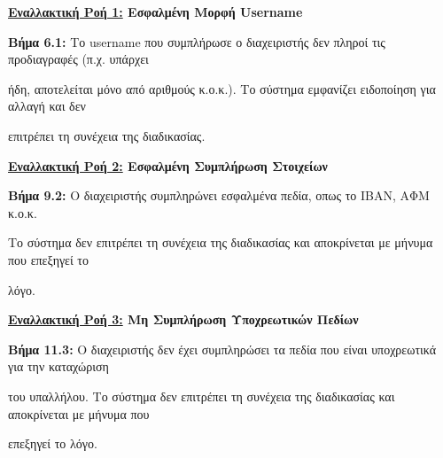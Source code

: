 \documentclass{article}
\begin{document}
  \textbf{\underline{Εναλλακτική Ροή 1:} Εσφαλμένη Μορφή Username} \vspace{0.2cm}
\par \textbf{Βήμα 6.1:} Το username που συμπλήρωσε ο διαχειριστής δεν πληροί τις προδιαγραφές (π.χ. υπάρχει \par ήδη, αποτελείται μόνο από αριθμούς κ.ο.κ.). Tο σύστημα εμφανίζει ειδοποίηση για αλλαγή και δεν \par επιτρέπει τη συνέχεια της διαδικασίας.\vspace{0.1cm}

\newpage

\textbf{\underline{Εναλλακτική Ροή 2:} Εσφαλμένη Συμπλήρωση Στοιχείων} \vspace{0.2cm}
\par \textbf{Βήμα 9.2:} Ο διαχειριστής συμπληρώνει εσφαλμένα πεδία, οπως το ΙΒΑΝ, ΑΦΜ κ.ο.κ. \par Το σύστημα δεν επιτρέπει τη συνέχεια της διαδικασίας και αποκρίνεται με μήνυμα που επεξηγεί το \par λόγο.  \vspace{0.2cm}

\textbf{\underline{Εναλλακτική Ροή 3:} Μη Συμπλήρωση Υποχρεωτικών Πεδίων} \vspace{0.2cm}
\par \textbf{Βήμα 11.3:} Ο διαχειριστής δεν έχει συμπληρώσει τα πεδία που είναι υποχρεωτικά για την καταχώριση \par του υπαλλήλου. Το σύστημα δεν επιτρέπει τη συνέχεια της διαδικασίας και αποκρίνεται με μήνυμα που \par επεξηγεί το λόγο. 

 
\end{document}
